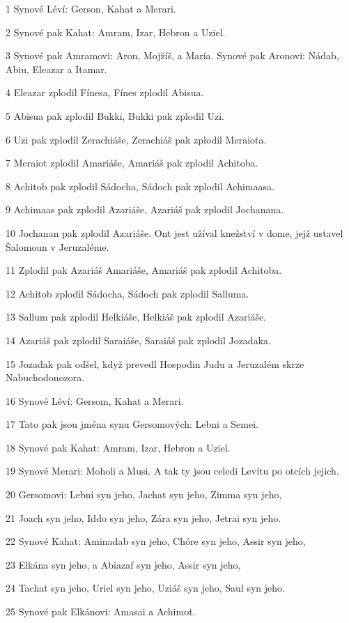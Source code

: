 \par 1 Synové Léví: Gerson, Kahat a Merari.
\par 2 Synové pak Kahat: Amram, Izar, Hebron a Uziel.
\par 3 Synové pak Amramovi: Aron, Mojžíš, a Maria. Synové pak Aronovi: Nádab, Abiu, Eleazar a Itamar.
\par 4 Eleazar zplodil Fínesa, Fínes zplodil Abisua.
\par 5 Abisua pak zplodil Bukki, Bukki pak zplodil Uzi.
\par 6 Uzi pak zplodil Zerachiáše, Zerachiáš pak zplodil Meraiota.
\par 7 Meraiot zplodil Amariáše, Amariáš pak zplodil Achitoba.
\par 8 Achitob pak zplodil Sádocha, Sádoch pak zplodil Achimaasa.
\par 9 Achimaas pak zplodil Azariáše, Azariáš pak zplodil Jochanana.
\par 10 Jochanan pak zplodil Azariáše. Ont jest užíval knežství v dome, jejž ustavel Šalomoun v Jeruzaléme.
\par 11 Zplodil pak Azariáš Amariáše, Amariáš pak zplodil Achitoba.
\par 12 Achitob zplodil Sádocha, Sádoch pak zplodil Salluma.
\par 13 Sallum pak zplodil Helkiáše, Helkiáš pak zplodil Azariáše.
\par 14 Azariáš pak zplodil Saraiáše, Saraiáš pak zplodil Jozadaka.
\par 15 Jozadak pak odšel, když prevedl Hospodin Judu a Jeruzalém skrze Nabuchodonozora.
\par 16 Synové Léví: Gersom, Kahat a Merari.
\par 17 Tato pak jsou jména synu Gersomových: Lebni a Semei.
\par 18 Synové pak Kahat: Amram, Izar, Hebron a Uziel.
\par 19 Synové Merari: Moholi a Musi. A tak ty jsou celedi Levítu po otcích jejich.
\par 20 Gersomovi: Lebni syn jeho, Jachat syn jeho, Zimma syn jeho,
\par 21 Joach syn jeho, Iddo syn jeho, Zára syn jeho, Jetrai syn jeho.
\par 22 Synové Kahat: Aminadab syn jeho, Chóre syn jeho, Assir syn jeho,
\par 23 Elkána syn jeho, a Abiazaf syn jeho, Assir syn jeho,
\par 24 Tachat syn jeho, Uriel syn jeho, Uziáš syn jeho, Saul syn jeho.
\par 25 Synové pak Elkánovi: Amasai a Achimot.

